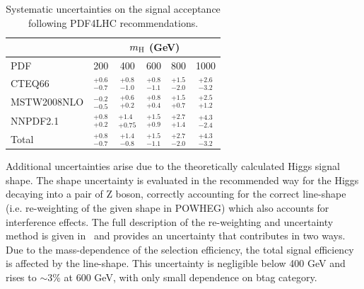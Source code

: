 \def\arraystretch{1.7}
\begin{table}[hb]
\caption{Systematic uncertainties on the signal acceptance following PDF4LHC recommendations.}
\label{tab:pdf}
\begin{center}
\small
\begin{tabular}{|l|ccccc|}
\cline{2-6}
\multicolumn{1}{c|}{} & \multicolumn{5}{c|}{$m_{\mathrm{H}}$ (GeV)} \\ \hline
PDF         & 200               & 400               & 600               & 800               & 1000             \\ \hline
CTEQ66      & $^{+0.6}_{-0.7}$  & $^{+0.8}_{-1.0}$  & $^{+0.8}_{-1.1}$  & $^{+1.5}_{-2.0}$  & $^{+2.6}_{-3.2}$ \\
MSTW2008NLO & $^{-0.2}_{-0.5}$  & $^{+0.6}_{+0.2}$  & $^{+0.8}_{+0.4}$  & $^{+1.5}_{+0.7}$  & $^{+2.5}_{+1.2}$ \\
NNPDF2.1    & $^{+0.8}_{+0.2}$  & $^{+1.4}_{+0.75}$ & $^{+1.5}_{+0.9}$  & $^{+2.7}_{+1.4}$  & $^{+4.3}_{-2.4}$ \\ \hline
Total       & $^{+0.8}_{-0.7}$  & $^{+1.4}_{-0.8}$  & $^{+1.5}_{-1.1}$  & $^{+2.7}_{-2.0}$  & $^{+4.3}_{-3.2}$ \\ \hline
\end{tabular}
\end{center}
\end{table}
\def\arraystretch{1}

Additional uncertainties arise due to the theoretically calculated Higgs signal shape. The shape uncertainty is evaluated in the recommended way for the Higgs decaying into a pair of Z boson, correctly accounting for the correct line-shape (i.e. re-weighting of the given shape in POWHEG) which also accounts for interference effects. The full description of the re-weighting and uncertainty method is given in~\cite{4l} and provides an uncertainty that contributes in two ways. Due to the mass-dependence of the selection efficiency, the total signal efficiency is affected by the line-shape. 
This uncertainty is negligible below 400 GeV{} and rises to $\sim3\%$ at 600 GeV{}, with only small dependence on btag category.


